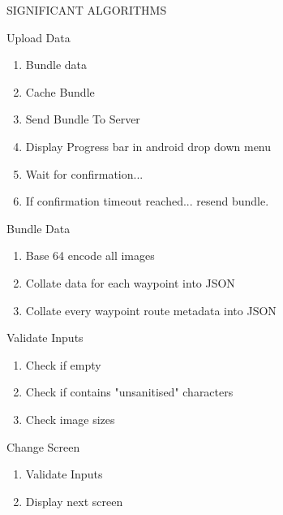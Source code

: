 \documentclass{article}
\begin{document}
	\clearpage
	\begin{section}{SIGNIFICANT ALGORITHMS}
		\begin{subsection}{Upload Data}
		    \begin{enumerate}
		        \item{Bundle data}
		        \item{Cache Bundle}
		        \item{Send Bundle To Server}
		        \item{Display Progress bar in android drop down menu}
		        \item{Wait for confirmation...}
		        \item{If confirmation timeout reached... resend bundle.}
		    \end{enumerate}
		\end{subsection}
		
    \begin{subsection}{Bundle Data}
        \begin{enumerate}
            \item{Base 64 encode all images}
            \item{Collate data for each waypoint into JSON}
            \item{Collate every waypoint route metadata into JSON}
        \end{enumerate}
    \end{subsection}

    \begin{subsection}{Validate Inputs}
        \begin{enumerate}
            \item{Check if empty}
            \item{Check if contains "unsanitised" characters}
            \item{Check image sizes}
        \end{enumerate}
    \end{subsection}

    \begin{subsection}{Change Screen}
        \begin{enumerate}
            \item{Validate Inputs}
            \item{Display next screen}
        \end{enumerate}
    \end{subsection}
	\end{section}
	
\end{document}
